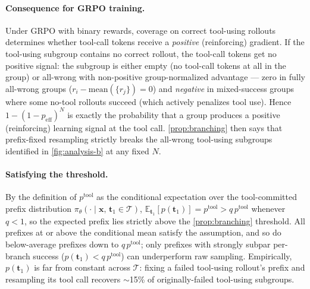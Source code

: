 \documentclass{llmxive}
\providecommand{\bm}[1]{\boldsymbol{#1}}
\providecommand{\vt}{{\bm{t}}}
\providecommand{\vx}{{\bm{x}}}
\begin{document}
\paragraph{Consequence for GRPO training.}
Under GRPO with binary rewards, coverage on correct tool-using rollouts determines whether tool-call tokens receive a \emph{positive} (reinforcing) gradient. If the tool-using subgroup contains no correct rollout, the tool-call tokens get no positive signal: the subgroup is either empty (no tool-call tokens at all in the group) or all-wrong with non-positive group-normalized advantage --- zero in fully all-wrong groups ($r_i - \mathrm{mean}(\{r_j\}) = 0$) and \emph{negative} in mixed-success groups where some no-tool rollouts succeed (which actively penalizes tool use). Hence $1 - (1-p_{\text{eff}})^N$ is exactly the probability that a group produces a positive (reinforcing) learning signal at the tool call. \autoref{prop:branching} then says that prefix-fixed resampling strictly breaks the all-wrong tool-using subgroups identified in \autoref{fig:analysis-b} at any fixed $N$.

\paragraph{Satisfying the threshold.}
By the definition of $p^{\text{tool}}$ as the conditional expectation over the tool-committed prefix distribution $\pi_\theta(\cdot \mid \vx,\, \vt_1 \in \mathcal{T})$, $\mathbb{E}_{\vt_1}[p(\vt_1)] = p^{\text{tool}} > q\, p^{\text{tool}}$ whenever $q < 1$, so the expected prefix lies strictly above the \autoref{prop:branching} threshold. All prefixes at or above the conditional mean satisfy the assumption, and so do below-average prefixes down to $q\, p^{\text{tool}}$; only prefixes with strongly subpar per-branch success ($p(\vt_1) < q\, p^{\text{tool}}$) can underperform raw sampling. Empirically, $p(\vt_1)$ is far from constant across $\mathcal{T}$: fixing a failed tool-using rollout's prefix and resampling its tool call recovers $\sim$15\% of originally-failed tool-using subgroups.
\end{document}
